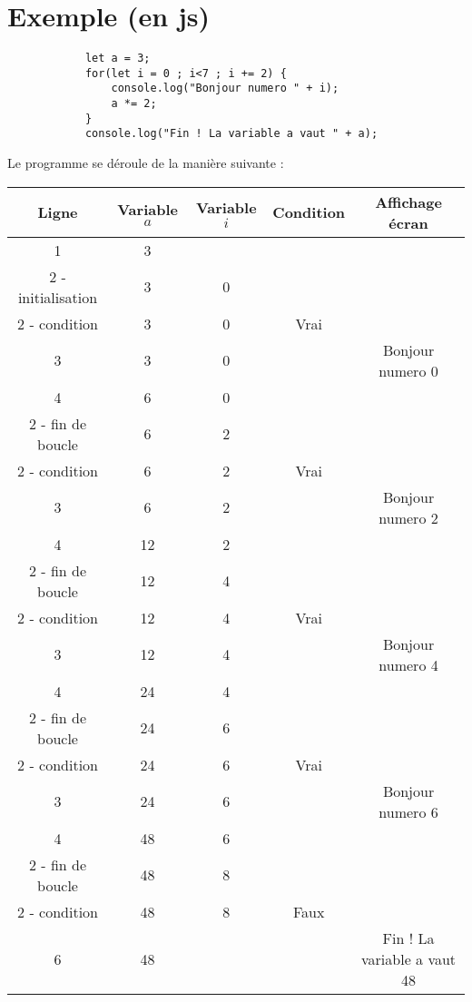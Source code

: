 \documentclass{article}
\begin{document}
	\section{Exemple (en js)}			
		\begin{lstlisting}
			let a = 3;
			for(let i = 0 ; i<7 ; i += 2) {
				console.log("Bonjour numero " + i);
				a *= 2;
			}
			console.log("Fin ! La variable a vaut " + a);
		\end{lstlisting}
		
		Le programme se déroule de la manière suivante :
		
		\begin{tabular}{|c|c|c|c|c|}
			\hline
			Ligne & Variable $a$ & Variable $i$ & Condition & Affichage écran\\
			\hline
			\hline
			1&3&&&\\
			\hline
			2 - initialisation&3&0&&\\
			\hline
			2 - condition&3&0&Vrai&\\
			\hline
			3&3&0&&Bonjour numero 0\\
			\hline
			4&6&0&&\\
			\hline
			2 - fin de boucle&6&2&&\\
			\hline
			2 - condition&6&2&Vrai&\\
			\hline
			3&6&2&&Bonjour numero 2\\
			\hline
			4&12&2&&\\
			\hline
			2 - fin de boucle&12&4&&\\
			\hline
			2 - condition&12&4&Vrai&\\
			\hline
			3&12&4&&Bonjour numero 4\\
			\hline
			4&24&4&&\\
			\hline
			2 - fin de boucle&24&6&&\\
			\hline
			2 - condition&24&6&Vrai&\\
			\hline
			3&24&6&&Bonjour numero 6\\
			\hline
			4&48&6&&\\
			\hline
			2 - fin de boucle&48&8&&\\
			\hline
			2 - condition&48&8&Faux&\\
			\hline
			6&48&&&Fin ! La variable a vaut 48\\
			\hline
		\end{tabular}
\end{document}

